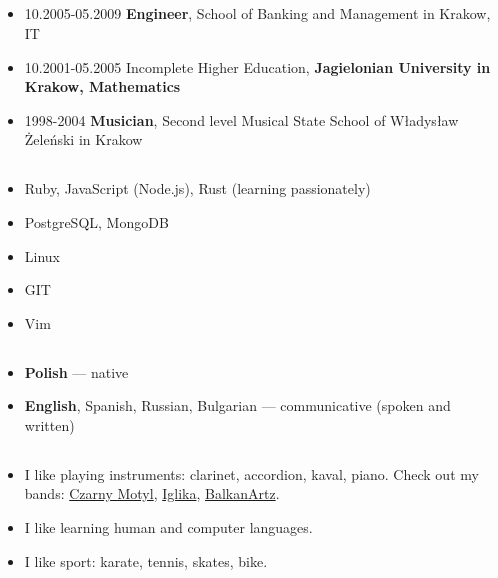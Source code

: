 \documentclass[a4paper]{article}
\begin{document}
\subsection*{}
\begin{itemize}
  \item
    10.2005-05.2009 \textbf{Engineer}, School of Banking and Management in Krakow, IT

  \item
    10.2001-05.2005 Incomplete Higher Education,
    \textbf{Jagielonian University in Krakow, Mathematics}

  \item
    1998-2004 \textbf{Musician},
    Second level Musical State School of Władysław Żeleński in Krakow
\end{itemize}

\subsection*{}
\begin{itemize}
\item
  Ruby, JavaScript (Node.js), Rust (learning passionately)
\item
  PostgreSQL, MongoDB
\item
  Linux
\item
  GIT
\item
  Vim
\end{itemize}

\subsection*{}
\begin{itemize}
\item
  \textbf{Polish} --- native
\item
  \textbf{English}, Spanish, Russian, Bulgarian --- communicative (spoken and written)
\end{itemize}

\subsection*{}
\begin{itemize}
\item
	I like playing instruments: clarinet, accordion, kaval, piano. Check out my bands: \href{https://soundcloud.com/czarny-motyl}{Czarny Motyl}, \href{https://soundcloud.com/iglika-pl}{Iglika}, \href{https://soundcloud.com/user-919481466}{BalkanArtz}.
\item
  I like learning human and computer languages.
\item
  I like sport: karate, tennis, skates, bike.
\end{itemize}
\end{document}
